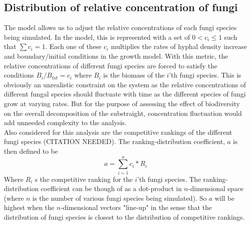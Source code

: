 \documentclass[10pt]{article}
\begin{document}
\subsection*{Distribution of relative concentration of fungi}
The model allows us to adjust the relative concentrations of each fungi species being simulated. In the model, this is represented with a set of $0<c_{i}\leq 1$ such that $\sum c_{i} = 1$. Each one of these $c_{i}$ multiplies the rates of hyphal density increase and boundary/initial conditions in the growth model. With this metric, the relative concentrations of different fungi species are forced to satisfy the conditions $B_{i}/B_{tot}=c_{i}$ where $B_{i}$ is the biomass of the $i$'th fungi species. This is obviously an unrealistic constraint on the system as the relative concentrations of different fungal species should fluctuate with time as the different species of fungi grow at varying rates. But for the purpose of assessing the effect of biodiversity on the overall decomposition of the substraight, concentration fluctuation would add unneeded complexity to the analysis. \\
Also considered for this analysis are the competitive rankings of the different fungi species (CITATION NEEDED). The ranking-distribution coefficient, $a$ is then defined to be
\begin{equation} \label{eq}
    a = \sum_{i=1}^{n} c_{i}*R_{i}
\end{equation}
Where $R_{i}$ s the competitive ranking for the $i$'th fungi species. The ranking-distribution coefficient can be though of as a dot-product in $n$-dimensional space (where $n$ is the number of various fungi species being simulated). So $a$ will be highest when the $n$-dimensional vectors "line-up" in the sense that the distribution of fungi species is closest to the distribution of competitive rankings.\\
\end{document}
